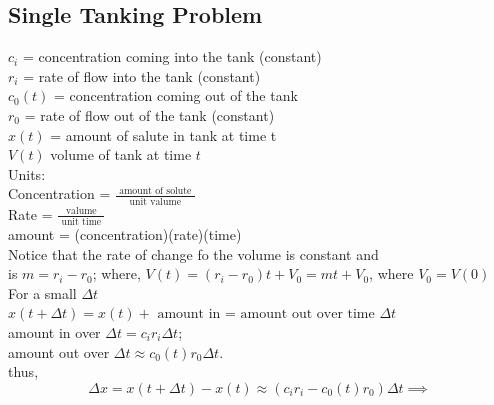 \documentclass[10pt,a4paper]{article}
\begin{document}
  \newpage
{}

\subsection*{Single Tanking Problem}
 \( c_i\) = concentration coming into the tank (constant) \\
 \( r_i\) = rate of flow into the tank (constant) \\
 \( c_0(t)\) = concentration coming out of the tank \\
 \( r_0\) = rate of flow out of the tank (constant) \\
 \( x(t) \) = amount of salute in tank at time t \\
 \( V(t)\) volume of tank at time \( t\) \\[5mm] 
 Units: \\
 Concentration = \( \frac{ \text{ amount of solute }}{ \text{ unit
 valume	 }}\) \\ 
 Rate = \( \frac{ \text{ valume }}{ \text{ unit time }}\) \\	 
 amount = (concentration)(rate)(time) \\[5mm]
 Notice that the rate of change fo the volume is constant and  \\
 is \( m = r_i - r_0\); where, \( V(t) = (r_i - r_0)t + V_0 = mt +
 V_0\), where \( V_0 = V(0)\) \\
 For a small \( \Delta t\)\nonumber\\
 \( x(t + \Delta t) = x(t) + \text{ amount in = amount out over time }
 \Delta t\) \\[5mm]
 amount in over \( \Delta t = c_i r_i \Delta t\); \\
 amount out over \( \Delta t \approx c_0(t) r_0 \Delta t\). \\
 thus,  \\
 \[ \Delta x = x(t + \Delta t) - x(t) \approx (c_i r_i - c_0(t)r_0) \Delta
 t \implies \]
\end{document}
